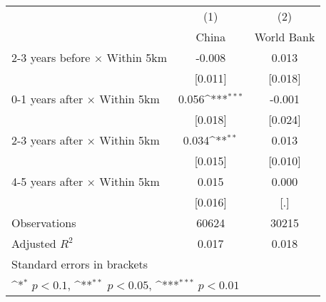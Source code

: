 {
\def\sym#1{\ifmmode^{#1}\else\(^{#1}\)\fi}
\begin{tabular}{l*{2}{c}}
\hline\hline
                    &\multicolumn{1}{c}{(1)}&\multicolumn{1}{c}{(2)}\\
                    &\multicolumn{1}{c}{China}&\multicolumn{1}{c}{World Bank}\\
\hline
2-3 years before $\times$ Within 5km&      -0.008         &       0.013         \\
                    &     [0.011]         &     [0.018]         \\
0-1 years after $\times$ Within 5km&       0.056\sym{***}&      -0.001         \\
                    &     [0.018]         &     [0.024]         \\
2-3 years after $\times$ Within 5km&       0.034\sym{**} &       0.013         \\
                    &     [0.015]         &     [0.010]         \\
4-5 years after $\times$ Within 5km&       0.015         &       0.000         \\
                    &     [0.016]         &         [.]         \\
\hline
Observations        &       60624         &       30215         \\
Adjusted \(R^{2}\)  &       0.017         &       0.018         \\
\hline\hline
\multicolumn{3}{l}{\footnotesize Standard errors in brackets}\\
\multicolumn{3}{l}{\footnotesize \sym{*} \(p<0.1\), \sym{**} \(p<0.05\), \sym{***} \(p<0.01\)}\\
\end{tabular}
}
